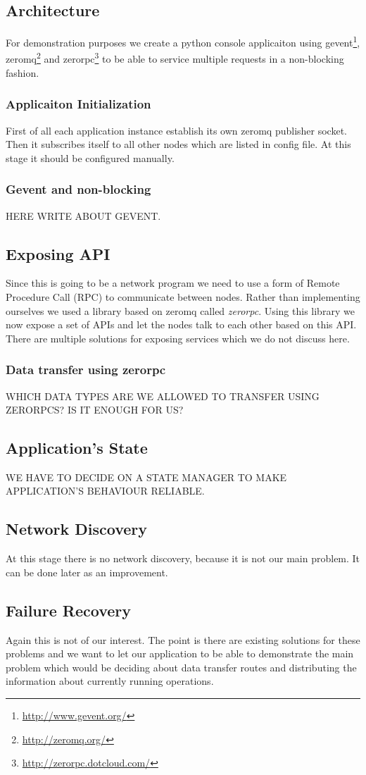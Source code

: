 \subsection{Architecture}
For demonstration purposes we create a python console applicaiton using gevent\footnote{\url{http://www.gevent.org/}}, zeromq\footnote{\url{http://zeromq.org/}} and zerorpc\footnote{\url{http://zerorpc.dotcloud.com/}} to be able to service multiple requests in a non-blocking fashion.

\subsubsection{Applicaiton Initialization}
First of all each application instance establish its own zeromq publisher socket. Then it subscribes itself to all other nodes which are listed in config file. At this stage it should be configured manually.

\subsubsection{Gevent and non-blocking}
HERE WRITE ABOUT GEVENT.

\subsection{Exposing API}
Since this is going to be a network program we need to use a form of Remote Procedure Call (RPC) to communicate between nodes. Rather than implementing ourselves we used a library based on zeromq called \textit{zerorpc}. Using this library we now expose a set of APIs and let the nodes talk to each other based on this API. There are multiple solutions for exposing services which we do not discuss here.

\subsubsection{Data transfer using zerorpc}
WHICH DATA TYPES ARE WE ALLOWED TO TRANSFER USING ZERORPCS? IS IT ENOUGH FOR US?

\subsection{Application's State}
WE HAVE TO DECIDE ON A STATE MANAGER TO MAKE APPLICATION'S BEHAVIOUR RELIABLE.

\subsection{Network Discovery}
At this stage there is no network discovery, because it is not our main problem. It can be done later as an improvement.

\subsection{Failure Recovery}
Again this is not of our interest. The point is there are existing solutions for these problems and we want to let our application to be able to demonstrate the main problem which would be deciding about data transfer routes and distributing the information about currently running operations.


